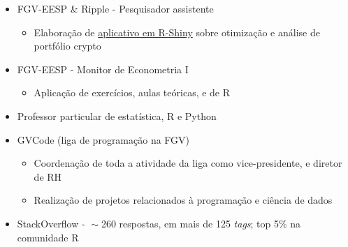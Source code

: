 \documentclass[11pt,letterpaper]{article}
\begin{document}
\hspace{-0.6cm}
\begin{minipage}[t]{.47\textwidth}
\begin{itemize}
\item FGV-EESP \& Ripple - Pesquisador assistente
\begin{itemize}
    \item Elaboração de \href{https://github.com/mevaldt/diversified_crypto}{aplicativo em R-Shiny} sobre otimização e análise de portfólio crypto
\end{itemize}

\item FGV-EESP - Monitor de Econometria I
\begin{itemize}
    \item Aplicação de exercícios, aulas teóricas, e de R 
\end{itemize}
\item Professor particular de estatística, R e Python
\end{itemize}
\end{minipage}
\hfill
\begin{minipage}[t]{.47\textwidth}
\begin{itemize}
\item GVCode (liga de programação na FGV)
\begin{itemize}
    \item Coordenação de toda a atividade da liga como vice-presidente, e diretor de RH
    \item Realização de projetos relacionados à programação e ciência de dados
\end{itemize}
\item StackOverflow - $\!\sim$260 respostas, em mais de 125 \textit{tags}; top 5\% na comunidade R
\end{itemize}
\end{minipage}

\end{document}
